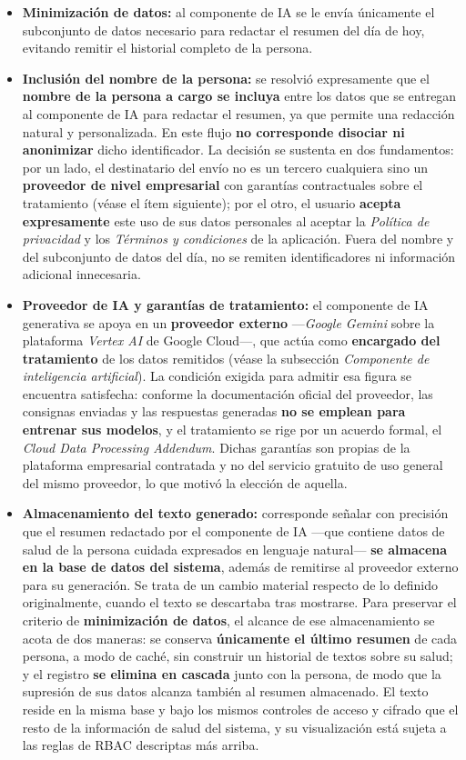 \documentclass[a4paper,12pt]{article}
\begin{document}
    \begin{itemize}
        \item \textbf{Minimización de datos:} al componente de IA se le envía únicamente el subconjunto de datos necesario para redactar el resumen del día de hoy, evitando remitir el historial completo de la persona.
        \item \textbf{Inclusión del nombre de la persona:} se resolvió expresamente que el \textbf{nombre de la persona a cargo se incluya} entre los datos que se entregan al componente de IA para redactar el resumen, ya que permite una redacción natural y personalizada. En este flujo \textbf{no corresponde disociar ni anonimizar} dicho identificador. La decisión se sustenta en dos fundamentos: por un lado, el destinatario del envío no es un tercero cualquiera sino un \textbf{proveedor de nivel empresarial} con garantías contractuales sobre el tratamiento (véase el ítem siguiente); por el otro, el usuario \textbf{acepta expresamente} este uso de sus datos personales al aceptar la \textit{Política de privacidad} y los \textit{Términos y condiciones} de la aplicación. Fuera del nombre y del subconjunto de datos del día, no se remiten identificadores ni información adicional innecesaria.
        \item \textbf{Proveedor de IA y garantías de tratamiento:} el componente de IA generativa se apoya en un \textbf{proveedor externo} —\textit{Google Gemini} sobre la plataforma \textit{Vertex AI} de Google Cloud—, que actúa como \textbf{encargado del tratamiento} de los datos remitidos (véase la subsección \textit{Componente de inteligencia artificial}). La condición exigida para admitir esa figura se encuentra satisfecha: conforme la documentación oficial del proveedor, las consignas enviadas y las respuestas generadas \textbf{no se emplean para entrenar sus modelos}, y el tratamiento se rige por un acuerdo formal, el \textit{Cloud Data Processing Addendum}\cite{GoogleCloudDataGovernance}. Dichas garantías son propias de la plataforma empresarial contratada y no del servicio gratuito de uso general del mismo proveedor, lo que motivó la elección de aquella.
        \item \textbf{Almacenamiento del texto generado:} corresponde señalar con precisión que el resumen redactado por el componente de IA —que contiene datos de salud de la persona cuidada expresados en lenguaje natural— \textbf{se almacena en la base de datos del sistema}, además de remitirse al proveedor externo para su generación. Se trata de un cambio material respecto de lo definido originalmente, cuando el texto se descartaba tras mostrarse. Para preservar el criterio de \textbf{minimización de datos}, el alcance de ese almacenamiento se acota de dos maneras: se conserva \textbf{únicamente el último resumen} de cada persona, a modo de caché, sin construir un historial de textos sobre su salud; y el registro \textbf{se elimina en cascada} junto con la persona, de modo que la supresión de sus datos alcanza también al resumen almacenado. El texto reside en la misma base y bajo los mismos controles de acceso y cifrado que el resto de la información de salud del sistema, y su visualización está sujeta a las reglas de RBAC descriptas más arriba.

\end{itemize}
\end{document}
